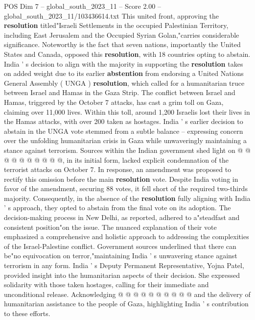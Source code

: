 \begin{textsample}{POS Dim 7 – global\_south\_2023\_11 – Score 2.00 – global\_south\_2023\_11/103436614.txt}  \label{ex:f7_pos_129}
This united front, approving the \textbf{resolution} titled"Israeli Settlements in the occupied Palestinian Territory, including East Jerusalem and the Occupied Syrian Golan,"carries considerable significance.
Noteworthy is the fact that seven nations, importantly the United States and Canada, opposed this \textbf{resolution}, with 18 countries opting to abstain.
India ' s decision to align with the majority in supporting the \textbf{resolution} takes on added weight due to its earlier \textbf{abstention} from endorsing a United Nations General Assembly ( UNGA ) \textbf{resolution}, which called for a humanitarian truce between Israel and Hamas in the Gaza Strip.
The conflict between Israel and Hamas, triggered by the October 7 attacks, has cast a grim toll on Gaza, claiming over 11,000 lives.
Within this toll, around 1,200 Israelis lost their lives in the Hamas attacks, with over 200 taken as hostages.
India ' s earlier decision to abstain in the UNGA vote stemmed from a subtle balance -- expressing concern over the unfolding humanitarian crisis in Gaza while unwaveringly maintaining a stance against terrorism.
Sources within the Indian government shed light on @ @ @ @ @ @ @ @ @ @, in its initial form, lacked explicit condemnation of the terrorist attacks on October 7.
In response, an amendment was proposed to rectify this omission before the main \textbf{resolution} vote.
Despite India voting in favor of the amendment, securing 88 votes, it fell short of the required two-thirds majority.
Consequently, in the absence of the \textbf{resolution} fully aligning with India ' s approach, they opted to abstain from the final vote on its adoption.
The decision-making process in New Delhi, as reported, adhered to a"steadfast and consistent position"on the issue.
The nuanced explanation of their vote emphasized a comprehensive and holistic approach to addressing the complexities of the Israel-Palestine conflict.
Government sources underlined that there can be"no equivocation on terror,"maintaining India ' s unwavering stance against terrorism in any form.
India ' s Deputy Permanent Representative, Yojna Patel, provided insight into the humanitarian aspects of their decision.
She expressed solidarity with those taken hostages, calling for their immediate and unconditional release.
Acknowledging @ @ @ @ @ @ @ @ @ @ and the delivery of humanitarian assistance to the people of Gaza, highlighting India ' s contribution to these efforts.

\end{textsample}
